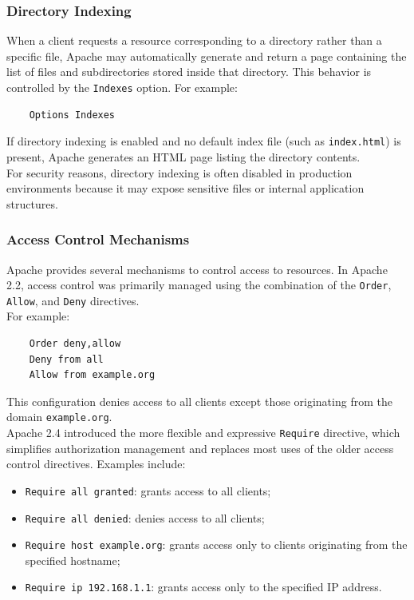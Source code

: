 \documentclass{scrbook}
\begin{document}
	\subsubsection{Directory Indexing}
	
	When a client requests a resource corresponding to a directory rather than a specific file, Apache may automatically generate and return a page containing the list of files and subdirectories stored inside that directory. This behavior is controlled by the \texttt{Indexes} option. For example:
	
	\begin{lstlisting}
	Options Indexes
	\end{lstlisting}
	
	If directory indexing is enabled and no default index file (such as \texttt{index.html}) is present, Apache generates an HTML page listing the directory contents.\\
	
	For security reasons, directory indexing is often disabled in production environments because it may expose sensitive files or internal application structures.
	
	\subsubsection{Access Control Mechanisms}
	
	Apache provides several mechanisms to control access to resources. In Apache 2.2, access control was primarily managed using the combination of the \texttt{Order}, \texttt{Allow}, and \texttt{Deny} directives.\\
	
	For example:
	\begin{lstlisting}
	Order deny,allow
	Deny from all
	Allow from example.org
	\end{lstlisting}
	
	This configuration denies access to all clients except those originating from the domain \texttt{example.org}.\\
	
	Apache 2.4 introduced the more flexible and expressive \texttt{Require} directive, which simplifies authorization management and replaces most uses of the older access control directives. Examples include:
	
	\begin{itemize}
		\item \texttt{Require all granted}: grants access to all clients;
		
		\item \texttt{Require all denied}: denies access to all clients;
		
		\item \texttt{Require host example.org}: grants access only to clients originating from the specified hostname;
		
		\item \texttt{Require ip 192.168.1.1}: grants access only to the specified IP address.
	\end{itemize}
	
\end{document}

